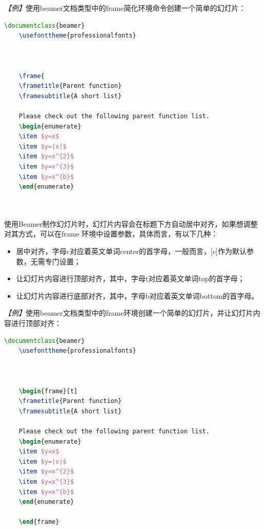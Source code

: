 \emph{【例】}使用beamer文档类型中的frame简化环境命令创建一个简单的幻灯片：
\begin{lstlisting}[language=TeX]
    \documentclass{beamer}
    \usefonttheme{professionalfonts}

    

    \frame{
    \frametitle{Parent function}
    \framesubtitle{A short list}

    Please check out the following parent function list.
    \begin{enumerate}
    \item $y=x$
    \item $y=|x|$
    \item $y=x^{2}$
    \item $y=x^{3}$
    \item $y=x^{b}$
    \end{enumerate}

    
\end{lstlisting}

使用Beamer制作幻灯片时，幻灯片内容会在标题下方自动居中对齐，如果想调整对其方式，可以在frame
环境中设置参数，具体而言，有以下几种：
\begin{itemize}
    \item [c] 居中对齐，字母c对应着英文单词center的首字母，一般而言，[c]作为默认参数，无需专门设置；
    \item [t] 让幻灯片内容进行顶部对齐，其中，字母t对应着英文单词top的首字母；
    \item [b] 让幻灯片内容进行底部对齐，其中，字母b对应着英文单词bottom的首字母。
\end{itemize}

\emph{【例】}使用beamer文档类型中的frame环境创建一个简单的幻灯片，并让幻灯片内容进行顶部对齐：
\begin{lstlisting}[language=TeX]
    \documentclass{beamer}
    \usefonttheme{professionalfonts}

    

    \begin{frame}[t]
    \frametitle{Parent function}
    \framesubtitle{A short list}

    Please check out the following parent function list.
    \begin{enumerate}
    \item $y=x$
    \item $y=|x|$
    \item $y=x^{2}$
    \item $y=x^{3}$
    \item $y=x^{b}$
    \end{enumerate}

    \end{frame}

    
\end{lstlisting}

